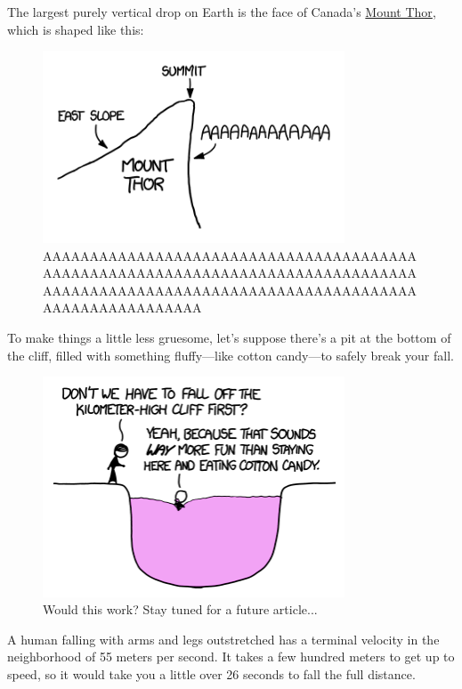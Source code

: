 {\hfill{}

{The largest purely vertical drop on Earth is the face of Canada's \href{http://en.wikipedia.org/wiki/Mount\_Thor}{Mount Thor}, which is shaped like this:}

\begin{figure}[!htbp]
\centering
\includegraphics[scale=0.5, max width=0.8\textwidth]{imgs/a/51/freefall_thor.png}
\caption{AAAAAAAAAAAAAAAAAAAAAAAAAAAAAAAAAAAAAAAAAAAAAAAAAAAAAAAAAAAAAAAAAAAAAAAAAAAAAAAAAAAAAAAAAAAAAAAAAAAAAAAAAAAAAAAAAAAAAAAAAAAAAAAAAAAAAAAAA}
\end{figure}

{To make things a little less gruesome, let's suppose there's a pit at the bottom of the cliff, filled with something fluffy—like cotton candy—to safely break your fall.}

\begin{figure}[!htbp]
\centering
\includegraphics[scale=0.5, max width=0.8\textwidth]{imgs/a/51/freefall_candy.png}
\caption{Would this work? Stay tuned for a future article...}
\end{figure}

{A human falling with arms and legs outstretched has a terminal velocity in the neighborhood of 55 meters per second. It takes a few hundred meters to get up to speed, so it would take you a little over 26 seconds to fall the full distance.}

}
